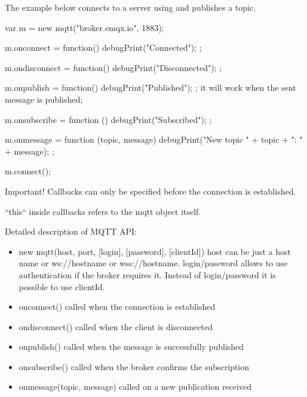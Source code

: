 The example below connects to a server using and publishes a topic.

\begin{listingverbatim}
var m = new mqtt("broker.emqx.io", 1883);

m.onconnect = function() {
	debugPrint("Connected");
};

m.ondisconnect = function() {
	debugPrint("Disconnected");
};

m.onpublish = function() {
	debugPrint("Published");
};
it will work when the sent message is published;

m.onsubscribe = function () {
	debugPrint("Subscribed");
};

m.onmessage = function (topic, message) {
	debugPrint("New topic " + topic + ": " + message);
};

m.connect();
\end{listingverbatim}

Important! Callbacks can only be specified before the connection is established.

``this`` inside callbacks refers to the mqtt object itself.

Detailed description of MQTT API:
\begin{itemize}
\item new mqtt(host, port, [login], [password], [clientId]) host can be just a host name or ws://hostname or wss://hostname. login/password allows to use authentication if the broker requires it. Instead of login/password it is possible to use clientId.
\item onconnect() called when the connection is established
\item ondisconnect() called when the client is disconnected
\item onpublish() called when the message is successfully published
\item onsubscribe() called when the broker confirms the subscription
\item onmessage(topic, message) called on a new publication received
\end{itemize}

